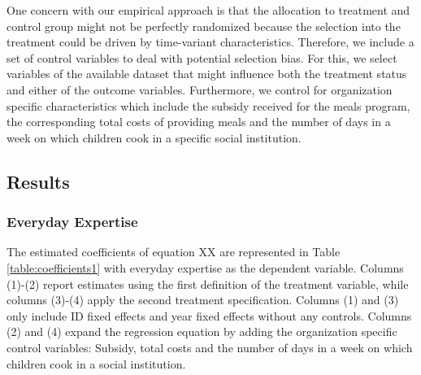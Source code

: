 \documentclass[12pt, a4paper, titlepage]{article}\usepackage[]{graphicx}\usepackage[]{color}
\begin{document}
One concern with our empirical approach is that the allocation to treatment and control group might not be perfectly randomized because the selection into the treatment could be driven by time-variant characteristics. Therefore, we include a set of control variables to deal with potential selection bias. For this, we select variables of the available dataset that might influence both the treatment status and either of the outcome variables. Furthermore, we control for organization specific characteristics which include the subsidy received for the meals program, the corresponding total costs of providing meals and the number of days in a week on which children cook in a specific social institution.

\subsection{Results}

\subsubsection{Everyday Expertise}

The estimated coefficients of equation XX are represented in Table \ref{table:coefficients1} with everyday expertise as the dependent variable. Columns (1)-(2) report estimates using the first definition of the treatment variable, while columns (3)-(4) apply the second treatment specification. Columns (1) and (3) only include ID fixed effects and year fixed effects without any controls. Columns (2) and (4) expand the regression equation by adding the organization specific control variables: Subsidy, total costs and the number of days in a week on which children cook in a social institution.
\end{document}
